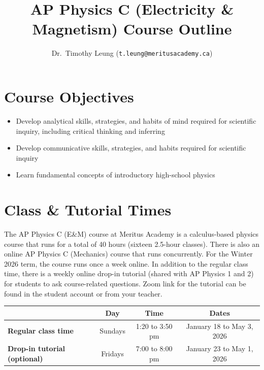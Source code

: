 \documentclass{../../oss-handout}
\title{AP Physics C (Electricity \& Magnetism) Course Outline}
\author{Dr.\ Timothy Leung (\texttt{t.leung@meritusacademy.ca})}
\begin{document}
\thispagestyle{title}
\gentitle


\section{Course Objectives}
\begin{itemize}[nosep]
\item Develop analytical skills, strategies, and habits of mind required for
  scientific inquiry, including critical thinking and inferring
\item Develop communicative skills, strategies, and habits required for
  scientific inquiry
\item Learn fundamental concepts of introductory high-school physics
\end{itemize}






\section{Class \& Tutorial Times}
The AP Physics C (E\&M) course at Meritus Academy is a calculus-based physics
course that runs for a total of 40 hours (sixteen 2.5-hour classes). There is
also an online AP Physics C (Mechanics) course that runs concurrently. For the
Winter 2026 term, the course runs once a week online. In addition to the
regular class time, there is a weekly online drop-in tutorial (shared with AP
Physics 1 and 2) for students to ask course-related questions. Zoom link for the
tutorial can be found in the student account or from your teacher.

\bgroup
\def\arraystretch{1.25}
\begin{center}
  \begin{tabular}{|p{1.9in}|c|c|c|}
    \rowcolor{lightgray}
    \hline
    & \textbf{Day} & \textbf{Time} & \textbf{Dates} \\
    \hline\hline
    
    \textbf{Regular class time} &
    \hspace{.1in}Sundays\hspace{.1in} &
    \hspace{.1in}1:20 to 3:50 pm\hspace{.1in} &
    January 18 to May 3, 2026 \\
    \hline
    
    \textbf{Drop-in tutorial (optional)} &
    Fridays & 7:00 to 8:00 pm & January 23 to May 1, 2026 \\
    \hline
  \end{tabular}
\end{center}
\egroup
\end{document}

